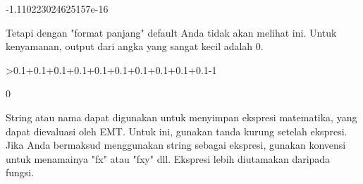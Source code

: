 \documentclass[a4paper,10pt]{article}
\begin{document}
\begin{eulernotebook}
\begin{eulercomment}
\begin{eulercomment}
\begin{euleroutput}
   -1.110223024625157e-16 
\end{euleroutput}
\begin{eulercomment}
Tetapi dengan "format panjang" default Anda tidak akan melihat ini.
Untuk kenyamanan, output dari angka yang sangat kecil adalah 0.
\end{eulercomment}
\begin{eulerprompt}
>0.1+0.1+0.1+0.1+0.1+0.1+0.1+0.1+0.1+0.1-1
\end{eulerprompt}
\begin{euleroutput}
  0
\end{euleroutput}
\begin{eulercomment}
String atau nama dapat digunakan untuk menyimpan ekspresi matematika,
yang dapat dievaluasi oleh EMT. Untuk ini, gunakan tanda kurung
setelah ekspresi. Jika Anda bermaksud menggunakan string sebagai
ekspresi, gunakan konvensi untuk menamainya "fx" atau "fxy" dll.
Ekspresi lebih diutamakan daripada fungsi.


\end{eulercomment}
\end{eulercomment}
\end{eulercomment}
\end{eulernotebook}
\end{document}
